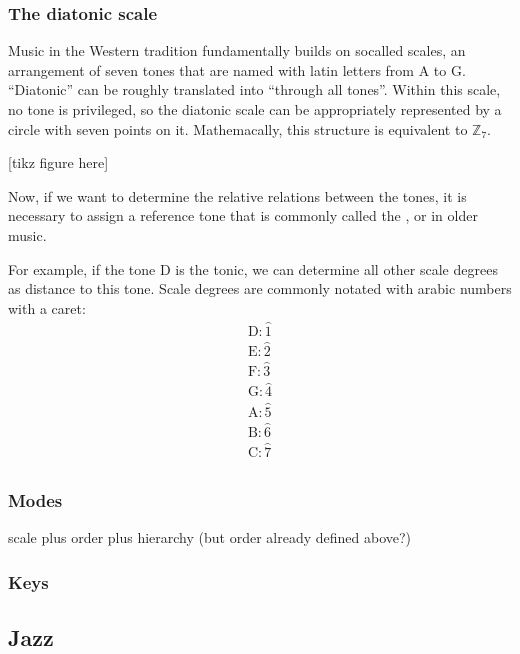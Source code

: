\documentclass[letterpaper,10pt,english]{sphinxmanual}
\begin{document}
\subsubsection{The diatonic scale}
\label{\detokenize{1_fundamentals:the-diatonic-scale}}
Music in the Western tradition fundamentally builds on
so\sphinxhyphen{}called  scales, an arrangement of seven tones
that are named with latin letters from A to G. “Diatonic” can
be roughly translated into “through all tones”. Within this scale,
no tone is privileged, so the diatonic scale can be appropriately
represented by a circle with seven points on it. Mathemacally,
this structure is equivalent to \(\mathbb{Z}_7\).

{[}tikz figure here{]}

Now, if we want to determine the relative relations between the tones,
it is necessary to assign a reference tone that is commonly called the ,
or  in older music.

For example, if the tone D is the tonic, we can determine all other scale degrees
as distance to this tone. Scale degrees are commonly notated with arabic numbers with a caret:
\begin{equation*}
\begin{split}\text{D}: \hat{1}\\
\text{E}: \hat{2}\\
\text{F}: \hat{3}\\
\text{G}: \hat{4}\\
\text{A}: \hat{5}\\
\text{B}: \hat{6}\\
\text{C}: \hat{7}\\\end{split}
\end{equation*}

\subsubsection{Modes}
\label{\detokenize{1_fundamentals:modes}}
scale plus order plus hierarchy (but order already defined above?)


\subsubsection{Keys}
\label{\detokenize{1_fundamentals:keys}}

\subsection{Jazz}
\label{\detokenize{1_fundamentals:jazz}}
\end{document}
